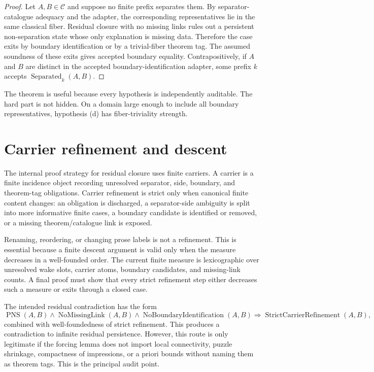 \documentclass[11pt]{amsart}
\begin{document}
\begin{proof}
Let \(A,B\in\mathcal C\) and suppose no finite prefix separates them.  By separator-catalogue adequacy and the adapter, the corresponding representatives lie in the same classical fiber.  Residual closure with no missing links rules out a persistent non-separation state whose only explanation is missing data.  Therefore the case exits by boundary identification or by a trivial-fiber theorem tag.  The assumed soundness of these exits gives accepted boundary equality.  Contrapositively, if \(A\) and \(B\) are distinct in the accepted boundary-identification adapter, some prefix \(k\) accepts \(\operatorname{Separated}_k(A,B)\).
\end{proof}

The theorem is useful because every hypothesis is independently auditable.  The hard part is not hidden.  On a domain large enough to include all boundary representatives, hypothesis (d) has fiber-triviality strength.

\section{Carrier refinement and descent}

The internal proof strategy for residual closure uses finite carriers.  A carrier is a finite incidence object recording unresolved separator, side, boundary, and theorem-tag obligations.  Carrier refinement is strict only when canonical finite content changes: an obligation is discharged, a separator-side ambiguity is split into more informative finite cases, a boundary candidate is identified or removed, or a missing theorem/catalogue link is exposed.

Renaming, reordering, or changing prose labels is not a refinement.  This is essential because a finite descent argument is valid only when the measure decreases in a well-founded order.  The current finite measure is lexicographic over unresolved wake slots, carrier atoms, boundary candidates, and missing-link counts.  A final proof must show that every strict refinement step either decreases such a measure or exits through a closed case.

The intended residual contradiction has the form
\[
\operatorname{PNS}(A,B)\wedge
\operatorname{NoMissingLink}(A,B)\wedge
\operatorname{NoBoundaryIdentification}(A,B)
        \Longrightarrow
\operatorname{StrictCarrierRefinement}(A,B),
\]
combined with well-foundedness of strict refinement.  This produces a contradiction to infinite residual persistence.  However, this route is only legitimate if the forcing lemma does not import local connectivity, puzzle shrinkage, compactness of impressions, or a priori bounds without naming them as theorem tags.  This is the principal audit point.
\end{document}
